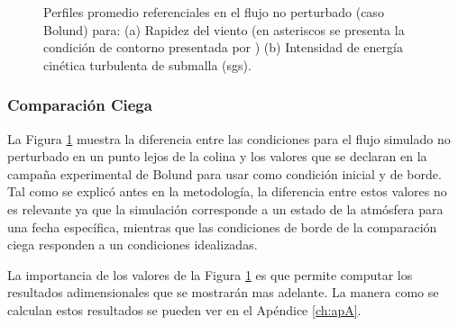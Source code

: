 \begin{figure}[H]
\begin{minipage}{0.5\linewidth}
	\end{minipage}%
	\caption{Perfiles promedio referenciales en el flujo no perturbado (caso Bolund) para: (a) Rapidez del viento (en asteriscos se presenta la condición de contorno presentada por \cite{Bechmann2011}) (b) Intensidad de energía cinética turbulenta de submalla (sgs).}
	\label{fig:06_bol_referencia}
\end{figure}
\subsubsection{Comparación Ciega}
La Figura \ref{fig:06_bol_referencia} muestra la diferencia entre las condiciones para el flujo simulado no perturbado en un punto lejos de la colina y los valores que se declaran en la campaña experimental de Bolund para usar como condición inicial y de borde. Tal como se explicó antes en la metodología, la diferencia entre estos valores no es relevante ya que la simulación corresponde a un estado de la atmósfera para una fecha específica, mientras que las condiciones de borde de la comparación ciega responden a un condiciones idealizadas. 

La importancia de los valores de la Figura \ref{fig:06_bol_referencia} es que permite computar los resultados adimensionales que se mostrarán mas adelante. La manera como se calculan estos resultados se pueden ver en el Apéndice \ref{ch:apA}.

